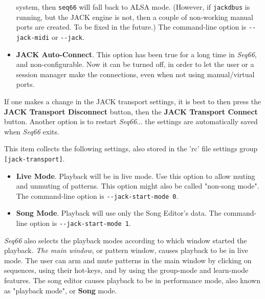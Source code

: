 \begin{itemize}
         system, then \texttt{seq66} will fall back to ALSA mode.
         (However, if \texttt{jackdbus} is running, but the JACK engine is not,
         then a couple of non-working manual ports are created.  To be fixed in
         the future.)
         The command-line option is \texttt{-{}-jack-midi}
         or \texttt{-{}-jack}.
      \item \textbf{JACK Auto-Connect}.
         This option has been true for a long time in \textsl{Seq66}, and
         non-configurable.  Now it can be turned off, in order to let the user
         or a session manager make the connections, even when not using
         manual/virtual ports.
   \end{itemize}

   If one makes a change in the JACK transport settings, it is best to
   then press the \textbf{JACK Transport Disconnect} button, then the
   \textbf{JACK Transport Connect} button.
   Another option is to restart
   \textsl{Seq66}... the settings are automatically saved when
   \textsl{Seq66} exits.

   This item collects the following settings, also stored in the 'rc' file
   settings group \texttt{[jack-transport]}.

   \begin{itemize}
      \item \textbf{Live Mode}.
         Playback will be in live mode.  Use this option to allow muting and
         unmuting of patterns.  This option might also be called "non-song
         mode".
         The command-line option is \texttt{-{}-jack-start-mode 0}.
      \item \textbf{Song Mode}.
         Playback will use only the Song Editor's data.
         The command-line option is \texttt{-{}-jack-start-mode 1}.
   \end{itemize}

   \textsl{Seq66} also selects the playback modes
   according to which window started the playback.
   \textsl{The main window}, or pattern
   window, causes playback to be in live mode.  The user can arm and mute
   patterns in the main window by clicking on sequences, using their hot-keys,
   and by using the group-mode and learn-mode features.
   The song editor causes playback to be in performance mode, also known as
   "playback mode", or \textbf{Song} mode.

